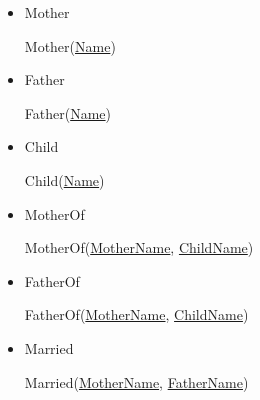 \documentclass[12pt]{article}
\begin{document}
\begin{enumerate}[1.]
\begin{enumerate}[a)]
\begin{itemize}
            \bigskip

            \item Mother

            \bigskip

            \quad Mother(\underline{Name})

            \bigskip

            \item Father

            \bigskip

            \quad Father(\underline{Name})

            \bigskip

            \item Child

            \bigskip

            \quad Child(\underline{Name})

            \bigskip

            \item MotherOf

            \bigskip

            \quad MotherOf(\underline{MotherName}, \underline{ChildName})

            \bigskip

            \item FatherOf

            \bigskip

            \quad FatherOf(\underline{MotherName}, \underline{ChildName})

            \bigskip

            \item Married

            \bigskip

            \quad Married(\underline{MotherName}, \underline{FatherName})

            \bigskip
        \end{itemize}
    \end{enumerate}


\end{enumerate}
\end{document}
